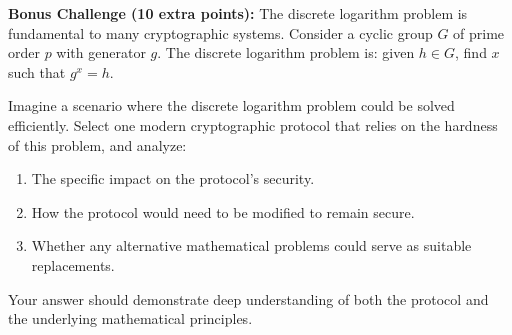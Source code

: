 \documentclass[10pt,a4paper,american]{article}
\begin{document}
\begin{tcolorbox}[colframe=EarthBrown!30!white,colback=EarthBrown!5!white]
	\textbf{Bonus Challenge (10 extra points):} The discrete logarithm problem is fundamental to many cryptographic systems. Consider a cyclic group $G$ of prime order $p$ with generator $g$. The discrete logarithm problem is: given $h \in G$, find $x$ such that $g^x = h$.

	Imagine a scenario where the discrete logarithm problem could be solved efficiently. Select one modern cryptographic protocol that relies on the hardness of this problem, and analyze:

	\begin{enumerate}
		\item The specific impact on the protocol's security.
		\item How the protocol would need to be modified to remain secure.
		\item Whether any alternative mathematical problems could serve as suitable replacements.
	\end{enumerate}

	Your answer should demonstrate deep understanding of both the protocol and the underlying mathematical principles.
\end{tcolorbox}
\end{document}
